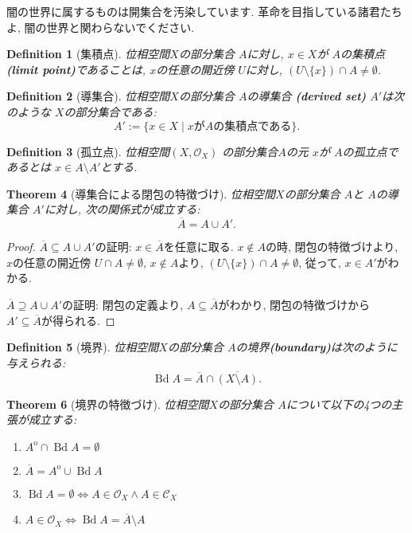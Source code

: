 \documentclass[lualatex]{ltjsbook}
\newcommand{\cl}[1]{\overline{ #1}  }
\newcommand{\Int}[1]{#1 ^{\mathrm{o}} }
\newcommand{\bd}[1]{\operatorname{Bd}{#1}}
\newtheorem{theorem}{Theorem}[chapter]
\newtheorem{definition}[theorem]{Definition}
\theoremstyle{remark}
\theoremstyle{plain}
\begin{document}
闇の世界に属するものは開集合を汚染しています. 革命を目指している諸君たちよ,  闇の世界と関わらないでください.

\begin{definition}[集積点]
	位相空間$X$の部分集合 $A$に対し,   $x \in X$が $A$の集積点\textbf{(limit point)}であることは, 
$x$の任意の開近傍 $U$に対し,   $\left( U\setminus \{x\}  \right) \cap A \neq \emptyset $.
\end{definition}

\begin{definition}[導集合]
	位相空間$X$の部分集合 $A$の導集合 \textbf{(derived set)} $A'$は次のような $X$の部分集合である:
	 \[
	A' := \{x \in X  \mid  x がAの集積点である\} 
	.\] 
\end{definition}

\begin{definition}[孤立点]
	位相空間$\left( X ,  \mathcal{O}_{X} \right)$ の部分集合$A$の元 $x$が $A$の孤立点であるとは $x \in  A\setminus A'$とする.
\end{definition}

\begin{theorem}[導集合による閉包の特徴づけ]
	位相空間$X$の部分集合 $A$と $A$の導集合 $A'$に対し,  次の関係式が成立する:
	\[
	\cl{A} = A \cup A'
	.\] 
\end{theorem}

\begin{proof}
	$\cl{A} \subseteq A \cup A'$の証明:  $x \in \cl{A}$を任意に取る.  
	$x \not\in  A $の時,  閉包の特徴づけより,  $x$の任意の開近傍 $U \cap A \neq \emptyset$,  $x \not\in  A$より,  $\left( U \setminus \{x\}  \right) \cap A \neq \emptyset $,  従って,  $x \in A'$がわかる.

	 $\cl{A} \supseteq A \cup A'$の証明: 閉包の定義より,   $A \subseteq \cl{A}$がわかり,  閉包の特徴づけから $A' \subseteq \cl{A}$が得られる.

\end{proof}

\begin{definition}[境界]
	位相空間$X$の部分集合 $A$の境界\textbf{(boundary)}は次のように与えられる:
	\[
	\bd{A}= \cl{A} \cap \cl{(X\setminus A)}
	.\] 
\end{definition}

\begin{theorem}[境界の特徴づけ]
	位相空間$X$の部分集合 $A$について以下の4つの主張が成立する: 
	 \begin{enumerate}
		\item $\Int{A} \cap \bd{A} = \emptyset$
		\item $\cl{A} = \Int{A} \cup \bd{A}$
		\item  $\bd{A} = \emptyset \iff A \in \mathcal{O}_X \land A \in \mathcal{C}_X$
	\item $A \in \mathcal{O}_X \iff \bd{A} = \cl{A} \setminus A $
	\end{enumerate}
\end{theorem}
\end{document}
